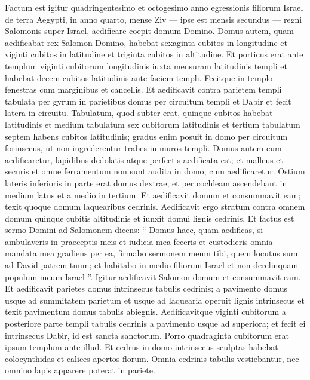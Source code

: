 \begin{biblechapter}
\begin{biblechapter}
\begin{biblechapter}
\begin{biblechapter}
\begin{biblechapter}
\begin{biblechapter}
\verse Factum est igitur quadringentesimo et octogesimo anno egressionis filiorum Israel de terra Aegypti, in anno quarto, mense Ziv — ipse est mensis secundus — regni Salomonis super Israel, aedificare coepit domum Domino. 
\verse Domus autem, quam aedificabat rex Salomon Domino, habebat sexaginta cubitos in longitudine et viginti cubitos in latitudine et triginta cubitos in altitudine. 
\verse Et porticus erat ante templum viginti cubitorum longitudinis iuxta mensuram latitudinis templi et habebat decem cubitos latitudinis ante faciem templi. 
\verse Fecitque in templo fenestras cum marginibus et cancellis. 
\verse Et aedificavit contra parietem templi tabulata per gyrum in parietibus domus per circuitum templi et Dabir et fecit latera in circuitu. 
\verse Tabulatum, quod subter erat, quinque cubitos habebat latitudinis et medium tabulatum sex cubitorum latitudinis et tertium tabulatum septem habens cubitos latitudinis; gradus enim posuit in domo per circuitum forinsecus, ut non ingrederentur trabes in muros templi.
 \verse Domus autem cum aedificaretur, lapidibus dedolatis atque perfectis aedificata est; et malleus et securis et omne ferramentum non sunt audita in domo, cum aedificaretur. 
\verse Ostium lateris inferioris in parte erat domus dextrae, et per cochleam ascendebant in medium latus et a medio in tertium. 
\verse Et aedificavit domum et consummavit eam; texit quoque domum laquearibus cedrinis. 
 \verse Aedificavit ergo stratum contra omnem domum quinque cubitis altitudinis et iunxit domui lignis cedrinis.
 \verse Et factus est sermo Domini ad Salomonem dicens: 
\verse “ Domus haec, quam aedificas, si ambulaveris in praeceptis meis et iudicia mea feceris et custodieris omnia mandata mea gradiens per ea, firmabo sermonem meum tibi, quem locutus sum ad David patrem tuum; 
\verse et habitabo in medio filiorum Israel et non derelinquam populum meum Israel ”.
 \verse Igitur aedificavit Salomon domum et consummavit eam. 
\verse Et aedificavit parietes domus intrinsecus tabulis cedrinis; a pavimento domus usque ad summitatem parietum et usque ad laquearia operuit lignis intrinsecus et texit pavimentum domus tabulis abiegnis. 
\verse Aedificavitque viginti cubitorum a posteriore parte templi tabulis cedrinis a pavimento usque ad superiora; et fecit ei intrinsecus Dabir, id est sancta sanctorum. 
\verse Porro quadraginta cubitorum erat ipsum templum ante illud. 
\verse Et cedrus in domo intrinsecus sculptas habebat colocynthidas et calices apertos florum. Omnia cedrinis tabulis vestiebantur, nec omnino lapis apparere poterat in pariete.

\end{biblechapter}
\end{biblechapter}
\end{biblechapter}
\end{biblechapter}
\end{biblechapter}
\end{biblechapter}
